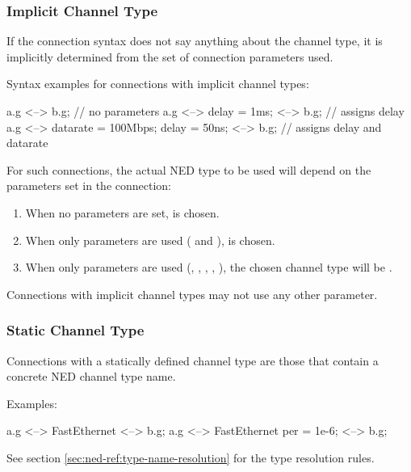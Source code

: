{\subsubsection{Implicit Channel Type}
\label{sec:ned-ref:implicit-channel-type}

If the connection syntax does not say anything about the channel type, it
is implicitly determined from the set of connection parameters used.

Syntax examples for connections with implicit channel types:

\begin{ned}
a.g <--> b.g; // no parameters
a.g <--> {delay = 1ms;} <--> b.g;  // assigns delay
a.g <--> {datarate = 100Mbps; delay = 50ns;} <--> b.g; // assigns delay and datarate
\end{ned}

For such connections, the actual NED type to be used will depend on the
parameters set in the connection:

\begin{enumerate}
  \item When no parameters are set,  is chosen.
  \item When only  parameters are used (
        and ),  is chosen.
  \item When only  parameters are used
        (, , , , ),
        the chosen channel type will be .
\end{enumerate}

Connections with implicit channel types may not use any other parameter.

\subsubsection{Static Channel Type}
\label{sec:ned-ref:static-channel-type}

Connections with a statically defined channel type are those that
contain a concrete NED channel type name.

Examples:

\begin{ned}
a.g <--> FastEthernet <--> b.g;
a.g <--> FastEthernet {per = 1e-6;} <--> b.g;
\end{ned}

See section \ref{sec:ned-ref:type-name-resolution} for the type resolution
rules.


}
